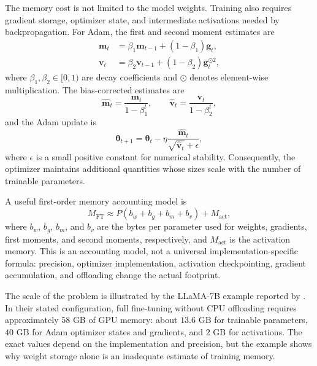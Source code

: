 The memory cost is not limited to the model weights. Training also requires
gradient storage, optimizer state, and intermediate activations needed by
backpropagation. For Adam, the first and second moment estimates are
\begin{align}
    \mathbf{m}_t
    &=
    \beta_1\mathbf{m}_{t-1}
    +(1-\beta_1)\mathbf{g}_t,
    \label{eq:peft-adam-m}\\
    \mathbf{v}_t
    &=
    \beta_2\mathbf{v}_{t-1}
    +(1-\beta_2)\mathbf{g}_t^{\odot 2},
    \label{eq:peft-adam-v}
\end{align}
where $\beta_1,\beta_2\in[0,1)$ are decay coefficients and $\odot$ denotes
element-wise multiplication. The bias-corrected estimates are
\begin{equation}
    \widehat{\mathbf{m}}_t
    =
    \frac{\mathbf{m}_t}{1-\beta_1^t},
    \qquad
    \widehat{\mathbf{v}}_t
    =
    \frac{\mathbf{v}_t}{1-\beta_2^t},
    \label{eq:peft-adam-bias-correction}
\end{equation}
and the Adam update is
\begin{equation}
    \boldsymbol{\theta}_{t+1}
    =
    \boldsymbol{\theta}_t
    -
    \eta
    \frac{\widehat{\mathbf{m}}_t}
    {\sqrt{\widehat{\mathbf{v}}_t}+\epsilon},
    \label{eq:peft-adam-update}
\end{equation}
where $\epsilon$ is a small positive constant for numerical stability.
Consequently, the optimizer maintains additional quantities whose sizes
scale with the number of trainable parameters.

A useful first-order memory accounting model is
\begin{equation}
    M_{\mathrm{FT}}
    \approx
    P(b_w+b_g+b_m+b_v)+M_{\mathrm{act}},
    \label{eq:peft-full-memory}
\end{equation}
where $b_w$, $b_g$, $b_m$, and $b_v$ are the bytes per parameter used for
weights, gradients, first moments, and second moments, respectively, and
$M_{\mathrm{act}}$ is the activation memory. This is an accounting model, not
a universal implementation-specific formula: precision, optimizer
implementation, activation checkpointing, gradient accumulation, and
offloading change the actual footprint.

The scale of the problem is illustrated by the LLaMA-7B example reported by
\textcite{he2025smt}. In their stated configuration, full fine-tuning without
CPU offloading requires approximately $58$ GB of GPU memory: about $13.6$ GB
for trainable parameters, $40$ GB for Adam optimizer states and gradients, and
$2$ GB for activations. The exact values depend on the implementation and
precision, but the example shows why weight storage alone is an inadequate
estimate of training memory.

